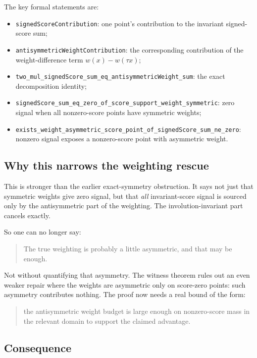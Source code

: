 \documentclass[11pt]{article}
\theoremstyle{remark}
\begin{document}
\noindent
The key formal statements are:
\begin{itemize}[leftmargin=1.5em]
  \item \texttt{signedScoreContribution}: one point's contribution to the invariant signed-score
  sum;
  \item \texttt{antisymmetricWeightContribution}: the corresponding contribution of the
  weight-difference term \(w(x)-w(\tau x)\);
  \item \texttt{two\_mul\_signedScore\_sum\_eq\_antisymmetricWeight\_sum}: the exact decomposition
  identity;
  \item \texttt{signedScore\_sum\_eq\_zero\_of\_score\_support\_weight\_symmetric}: zero signal
  when all nonzero-score points have symmetric weights;
  \item \texttt{exists\_weight\_asymmetric\_score\_point\_of\_signedScore\_sum\_ne\_zero}: nonzero
  signal exposes a nonzero-score point with asymmetric weight.
\end{itemize}

\subsection{Why this narrows the weighting rescue}

This is stronger than the earlier exact-symmetry obstruction.  It says not just that symmetric
weights give zero signal, but that \emph{all} invariant-score signal is sourced only by the
antisymmetric part of the weighting.  The involution-invariant part cancels exactly.

So one can no longer say:
\begin{quote}
The true weighting is probably a little asymmetric, and that may be enough.
\end{quote}

Not without quantifying that asymmetry.  The witness theorem rules out an even weaker repair where
the weights are asymmetric only on score-zero points: such asymmetry contributes nothing.  The proof
now needs a real bound of the form:
\begin{quote}
the antisymmetric weight budget is large enough on nonzero-score mass in the relevant domain to
support the claimed advantage.
\end{quote}

\subsection{Consequence}
\end{document}

